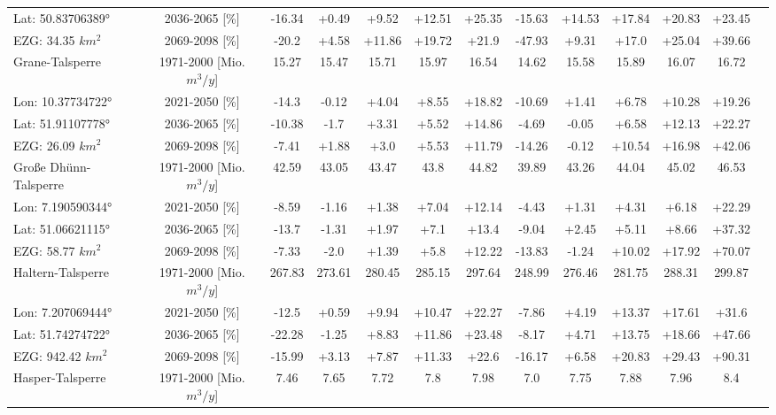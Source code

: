 \begin{longtable}{@{\extracolsep{\fill}}lc|ccccc||cccccc}
Lat: 50.83706389° & 2036-2065 [\%]  & -16.34 & +0.49 & +9.52 & +12.51 & +25.35 & -15.63 & +14.53 & +17.84 & +20.83 & +23.45 & \\ 
EZG: 34.35 $km^2$ & 2069-2098 [\%]  & -20.2 & +4.58 & +11.86 & +19.72 & +21.9 & -47.93 & +9.31 & +17.0 & +25.04 & +39.66 & \\ 
\hline 
Grane-Talsperre & 1971-2000 [Mio. $m^3/y$]  & 15.27 & 15.47 & 15.71 & 15.97 & 16.54 & 14.62 & 15.58 & 15.89 & 16.07 & 16.72 & \\ 
\cline{2-13} 
Lon: 10.37734722° & 2021-2050 [\%]  & -14.3 & -0.12 & +4.04 & +8.55 & +18.82 & -10.69 & +1.41 & +6.78 & +10.28 & +19.26 & \\ 
Lat: 51.91107778° & 2036-2065 [\%]  & -10.38 & -1.7 & +3.31 & +5.52 & +14.86 & -4.69 & -0.05 & +6.58 & +12.13 & +22.27 & \\ 
EZG: 26.09 $km^2$ & 2069-2098 [\%]  & -7.41 & +1.88 & +3.0 & +5.53 & +11.79 & -14.26 & -0.12 & +10.54 & +16.98 & +42.06 & \\ 
\hline 
Große Dhünn-Talsperre & 1971-2000 [Mio. $m^3/y$]  & 42.59 & 43.05 & 43.47 & 43.8 & 44.82 & 39.89 & 43.26 & 44.04 & 45.02 & 46.53 & \\ 
\cline{2-13} 
Lon: 7.190590344° & 2021-2050 [\%]  & -8.59 & -1.16 & +1.38 & +7.04 & +12.14 & -4.43 & +1.31 & +4.31 & +6.18 & +22.29 & \\ 
Lat: 51.06621115° & 2036-2065 [\%]  & -13.7 & -1.31 & +1.97 & +7.1 & +13.4 & -9.04 & +2.45 & +5.11 & +8.66 & +37.32 & \\ 
EZG: 58.77 $km^2$ & 2069-2098 [\%]  & -7.33 & -2.0 & +1.39 & +5.8 & +12.22 & -13.83 & -1.24 & +10.02 & +17.92 & +70.07 & \\ 
\hline 
Haltern-Talsperre & 1971-2000 [Mio. $m^3/y$]  & 267.83 & 273.61 & 280.45 & 285.15 & 297.64 & 248.99 & 276.46 & 281.75 & 288.31 & 299.87 & \\ 
\cline{2-13} 
Lon: 7.207069444° & 2021-2050 [\%]  & -12.5 & +0.59 & +9.94 & +10.47 & +22.27 & -7.86 & +4.19 & +13.37 & +17.61 & +31.6 & \\ 
Lat: 51.74274722° & 2036-2065 [\%]  & -22.28 & -1.25 & +8.83 & +11.86 & +23.48 & -8.17 & +4.71 & +13.75 & +18.66 & +47.66 & \\ 
EZG: 942.42 $km^2$ & 2069-2098 [\%]  & -15.99 & +3.13 & +7.87 & +11.33 & +22.6 & -16.17 & +6.58 & +20.83 & +29.43 & +90.31 & \\ 
\hline 
Hasper-Talsperre & 1971-2000 [Mio. $m^3/y$]  & 7.46 & 7.65 & 7.72 & 7.8 & 7.98 & 7.0 & 7.75 & 7.88 & 7.96 & 8.4 & \\ 
\cline{2-13} 

\end{longtable}
